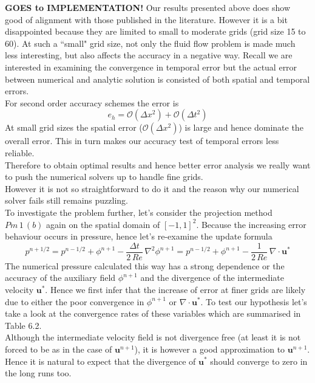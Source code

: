 \textbf{GOES to IMPLEMENTATION!}
\newpage
Our results presented above does show good of alignment with those published in the literature. However it is a bit disappointed because they are limited to small to moderate grids (grid size 15 to 60). At such a ``small" grid size, not only the fluid flow problem is made much less interesting, but also affects the accuracy in a negative way. Recall we are interested in examining the convergence in temporal error but the actual error between numerical and analytic solution is consisted of both spatial and temporal errors. \\
For second order accuracy schemes the error is
\begin{equation}
e_h = \mathcal{O}(\Delta x^2) + \mathcal{O}(\Delta t^2)
\end{equation}
At small grid sizes the spatial error ($\mathcal{O}(\Delta x^2)$) is large and hence dominate the overall error. This in turn makes our accuracy test of temporal errors less reliable.\\ Therefore to obtain optimal results and hence better error analysis we really want to push the numerical solvers up to handle fine grids.\\

However it is not so straightforward to do it and the reason why our numerical solver fails still remains puzzling.\\

To investigate the problem further, let's consider the projection method $Pm\,1\,(b)$ again on the spatial domain of $[-1,1]^2$. Because the increasing error behaviour occurs in pressure, hence let's re-examine the update formula
\begin{equation*}
p^{n+1/2} = p^{n-1/2} + \phi^{n+1} - \dfrac{\Delta t}{2\,Re}\,\nabla^2 \phi^{n+1} = p^{n-1/2} + \phi^{n+1} - \dfrac{1}{2\,Re}\,\nabla \cdot \textbf{u}^*
\end{equation*}
The numerical pressure calculated this way has a strong dependence or the accuracy of the auxiliary field $\phi^{n+1}$ and the divergence of the intermediate velocity $\textbf{u}^*$. Hence we first infer that the increase of error at finer grids are likely due to either the poor convergence in $\phi^{n+1}$ or $\nabla \cdot \textbf{u}^*$. To test our hypothesis let's take a look at the convergence rates of these variables which are summarised in Table 6.2. \\
Although the intermediate velocity field is not divergence free (at least it is not forced to be as in the case of $\textbf{u}^{n+1}$), it is however a good approximation to $\textbf{u}^{n+1}$. Hence it is natural to expect that the divergence of $\textbf{u}^*$ should converge to zero in the long runs too.\\

